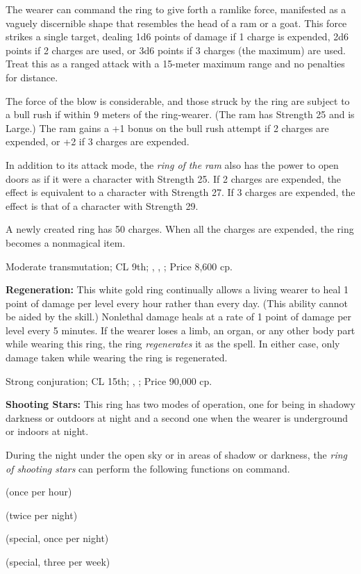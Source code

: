 The wearer can command the ring to give forth a ramlike force, manifested as a vaguely discernible shape that resembles the head of a ram or a goat. This force strikes a single target, dealing 1d6 points of damage if 1 charge is expended, 2d6 points if 2 charges are used, or 3d6 points if 3 charges (the maximum) are used. Treat this as a ranged attack with a 15-meter maximum range and no penalties for distance.

The force of the blow is considerable, and those struck by the ring are subject to a bull rush if within 9 meters of the ring-wearer. (The ram has Strength 25 and is Large.) The ram gains a +1 bonus on the bull rush attempt if 2 charges are expended, or +2 if 3 charges are expended.

In addition to its attack mode, the \emph{ring of the ram} also has the power to open doors as if it were a character with Strength 25. If 2 charges are expended, the effect is equivalent to a character with Strength 27. If 3 charges are expended, the effect is that of a character with Strength 29.

A newly created ring has 50 charges. When all the charges are expended, the ring becomes a nonmagical item.

Moderate transmutation; CL 9th; , , ; Price 8,600 cp.


\textbf{Regeneration:} This white gold ring continually allows a living wearer to heal 1 point of damage per level every hour rather than every day. (This ability cannot be aided by the  skill.) Nonlethal damage heals at a rate of 1 point of damage per level every 5 minutes. If the wearer loses a limb, an organ, or any other body part while wearing this ring, the ring \emph{regenerates} it as the spell. In either case, only damage taken while wearing the ring is regenerated.

Strong conjuration; CL 15th; , ; Price 90,000 cp.


\textbf{Shooting Stars:} This ring has two modes of operation, one for being in shadowy darkness or outdoors at night and a second one when the wearer is underground or indoors at night.

During the night under the open sky or in areas of shadow or darkness, the \emph{ring of shooting stars} can perform the following functions on command.

\begin{itemize*}
\item {} (once per hour)
\item {} (twice per night)
\item {} (special, once per night)
\item {} (special, three per week)
\end{itemize*}

